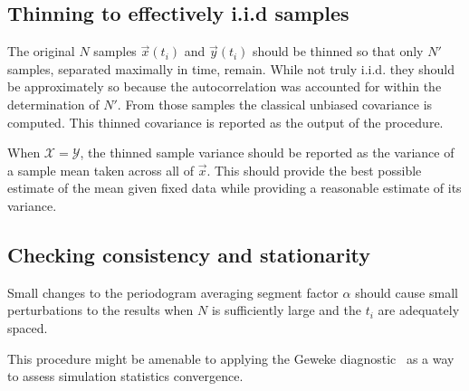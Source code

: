 \documentclass[letterpaper,11pt,nointlimits,reqno]{amsart}
\begin{document}
\subsection*{Thinning to effectively i.i.d samples}

The original $N$ samples $\vec{x}(t_i)$ and $\vec{y}(t_i)$ should be thinned so
that only $N'$ samples, separated maximally in time, remain.  While not truly
i.i.d. they should be approximately so because the autocorrelation was
accounted for within the determination of $N'$.  From those samples the
classical unbiased covariance is computed.  This thinned covariance is reported
as the output of the procedure.

When $\mathscr{X}=\mathscr{Y}$, the thinned sample variance should be reported
as the variance of a sample mean taken across all of $\vec{x}$.  This should
provide the best possible estimate of the mean given fixed data while providing
a reasonable estimate of its variance.

\subsection*{Checking consistency and stationarity}

Small changes to the periodogram averaging segment factor $\alpha$
should cause small perturbations to the results when $N$ is sufficiently
large and the $t_i$ are adequately spaced.

This procedure might be amenable to applying the Geweke
diagnostic~\cite{Geweke1992Evaluating} as a way to assess simulation statistics
convergence.




\end{document}
